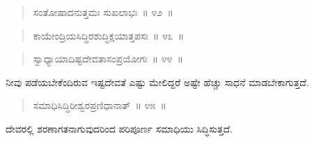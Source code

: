 \vspace{-0.35cm}

\begin{verse}
ಸಂತೋಷಾದನುತ್ತಮಃ ಸುಖಲಾಭಃ~॥ ೪೨~॥
\end{verse}

\vspace{-0.35cm}



\vspace{-0.35cm}

\begin{verse}
ಕಾಯೇಂದ್ರಿಯಸಿದ್ಧಿರಶುದ್ಧಿಕ್ಷಯಾತ್ತಪಸಃ~॥ ೪೩~॥
\end{verse}

\vspace{-0.35cm}


\vspace{-0.35cm}

\begin{verse}
ಸ್ವಾಧ್ಯಾಯಾದಿಷ್ಟದೇವತಾಸಂಪ್ರಯೋಗಃ~॥ ೪೪~॥
\end{verse}

\vspace{-0.35cm}


ನೀವು ಪಡೆಯಬೇಕೆಂದಿರುವ ಇಷ್ಟದೇವತೆ ಎಷ್ಟು ಮೇಲಿದ್ದರೆ ಅಷ್ಟೇ ಹೆಚ್ಚು ಸಾಧನೆ ಮಾಡಬೇಕಾಗುತ್ತದೆ. 

\vspace{-0.35cm}

\begin{verse}
ಸಮಾಧಿಸಿದ್ಧಿರೀಶ್ವರಪ್ರಣಿಧಾನಾತ್​~॥ ೪೫~॥
\end{verse}

\vspace{-0.35cm}


ದೇವರಲ್ಲಿ ಶರಣಾಗತನಾಗುವುದರಿಂದ ಪರಿಪೂರ್ಣ ಸಮಾಧಿಯು ಸಿದ್ಧಿಸುತ್ತದೆ. 

\eject

\vspace{-0.35cm}

